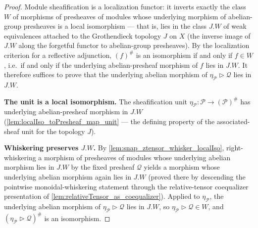 \begin{proof}
  Module sheafification is a localization functor: it inverts exactly the class
  \(W\) of morphisms of presheaves of modules whose underlying morphism of
  abelian-group presheaves is a local isomorphism --- that is, lies in the class
  \(J.W\) of weak equivalences attached to the Grothendieck topology \(J\) on
  \(X\) (the inverse image of \(J.W\) along the forgetful functor to
  abelian-group presheaves). By the localization criterion for a reflective
  adjunction, \((f)^{\#}\) is an isomorphism if and only if \(f \in W\), i.e.\
  if and only if the underlying abelian-presheaf morphism of \(f\) lies in
  \(J.W\). It therefore suffices to prove that the underlying abelian morphism
  of \(\eta_{\mathcal{P}} \rhd \mathcal{Q}\) lies in \(J.W\).

  \textbf{The unit is a local isomorphism.} The sheafification unit
  \(\eta_{\mathcal{P}} : \mathcal{P} \to (\mathcal{P})^{\#}\) has underlying
  abelian-presheaf morphism in \(J.W\)
  (\cref{lem:localIso_toPresheaf_map_unit} — the defining property of the
  associated-sheaf unit for the topology \(J\)).

  \textbf{Whiskering preserves \(J.W\).} By
  \cref{lem:snap_ztensor_whisker_localIso}, right-whiskering a morphism of
  presheaves of modules whose underlying abelian morphism lies in \(J.W\) by
  the fixed presheaf \(\mathcal{Q}\) yields a morphism whose underlying
  abelian morphism again lies in \(J.W\) (proved there by descending the
  pointwise monoidal-whiskering statement through the relative-tensor
  coequalizer presentation of
  \cref{lem:relativeTensor_as_coequalizer}). Applied to
  \(\eta_{\mathcal{P}}\), the underlying abelian morphism of
  \(\eta_{\mathcal{P}} \rhd \mathcal{Q}\) lies in \(J.W\), so
  \(\eta_{\mathcal{P}} \rhd \mathcal{Q} \in W\), and
  \((\eta_{\mathcal{P}} \rhd \mathcal{Q})^{\#}\) is an isomorphism.
\end{proof}


